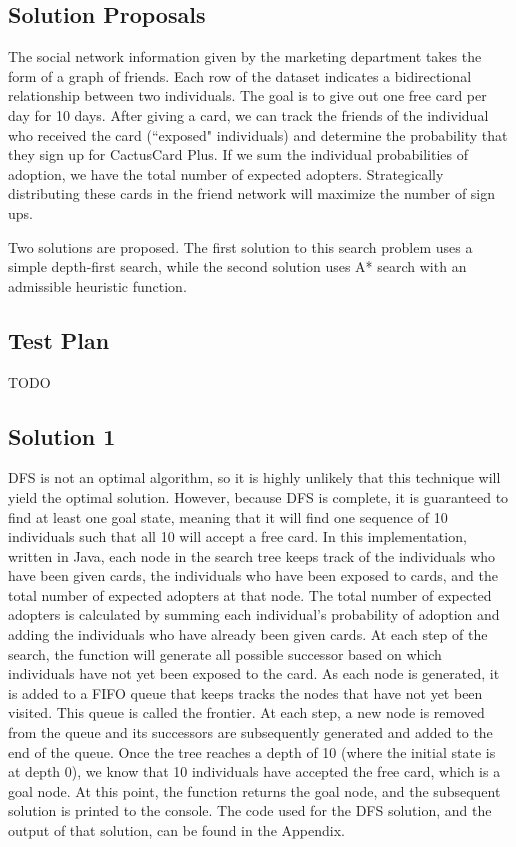 \documentclass[11pt,journal]{IEEEtran}
\begin{document}
\subsection{Solution Proposals}
The social network information given by the marketing department takes the form of a graph of friends. Each row of the dataset indicates a bidirectional relationship between two individuals. The goal is to give out one free card per day for 10 days. After giving a card, we can track the friends of the individual who received the card (``exposed" individuals) and determine the probability that they sign up for CactusCard Plus. If we sum the individual probabilities of adoption, we have the total number of expected adopters. Strategically distributing these cards in the friend network will maximize the number of sign ups.
\par
Two solutions are proposed. The first solution to this search problem uses a simple depth-first search, while the second solution uses A* search with an admissible heuristic function.

\subsection{Test Plan}
TODO

\subsection{Solution 1}
DFS is not an optimal algorithm, so it is highly unlikely that this technique will yield the optimal solution. However, because DFS is complete, it is guaranteed to find at least one goal state, meaning that it will find one sequence of 10 individuals such that all 10 will accept a free card. In this implementation, written in Java, each node in the search tree keeps track of the individuals who have been given cards, the individuals who have been exposed to cards, and the total number of expected adopters at that node. The total number of expected adopters is calculated by summing each individual's probability of adoption and adding the individuals who have already been given cards. At each step of the search, the function will generate all possible successor based on which individuals have not yet been exposed to the card. As each node is generated, it is added to a FIFO queue that keeps tracks the nodes that have not yet been visited. This queue is called the frontier. At each step, a new node is removed from the queue and its successors are subsequently generated and added to the end of the queue. Once the tree reaches a depth of 10 (where the initial state is at depth 0), we know that 10 individuals have accepted the free card, which is a goal node. At this point, the function returns the goal node, and the subsequent solution is printed to the console. The code used for the DFS solution, and the output of that solution, can be found in the Appendix.
\end{document}
